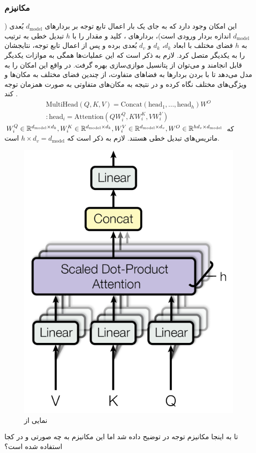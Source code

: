 \subsubsection{مکانیزم \multiheadattention{}}
این امکان وجود دارد که به جای یک بار اعمال تابع توجه بر بردارهای $d_\text{model}$ بُعدی ($d_\text{model}$ اندازه بردار ورودی است)، بردارهای \query{}، کلید و مقدار را با $h$ تبدیل خطی به ترتیب به $h$ فضای مختلف با ابعاد $d_k$، $d_k$ و $d_v$ بُعدی برده و پس از اعمال تابع توجه، نتایجشان را به یکدیگر متصل کرد. لازم به ذکر است که این عملیات‌ها همگی به موازات یکدیگر  قابل انجامند و می‌توان از پتانسیل موازی‌سازی \gpu{} بهره گرفت. در واقع \multiheadattention{} این امکان را به مدل می‌دهد تا با بردن بردارها به فضاهای متفاوت، از چندین فضای مختلف به مکان‌ها و ویژگی‌های مختلف نگاه کرده و در نتیجه به مکان‌های متفاوتی به صورت همزمان توجه کند \cite{transformer}.
\begin{gather}
	\text{MultiHead}(Q, K, V) = \text{Concat}(\text{head}_1, ..., \text{head}_h)W^O \nonumber
	\\
	: \text{head}_i = \text{Attention}(QW_i^Q, KW_i^K, VW_i^V)
\end{gather}
که
$W_i^Q \in {\mathbb{R}}^{d_\text{model} \times d_k},
	W_i^K \in {\mathbb{R}}^{d_\text{model} \times d_k},
	W_i^V \in {\mathbb{R}}^{d_\text{model} \times d_v},
	W^O \in {\mathbb{R}}^{hd_v \times d_\text{model}}$
ماتریس‌های تبدیل خطی هستند. لازم به ذکر است که $h \times d_v = d_\text{model}$ است.
\begin{figure}[H]
	\centering
	\includegraphics[width=.4
		\textwidth]{images/attention2.png}
	\caption{نمایی از \multiheadattention{}}
\end{figure}
تا به اینجا مکانیزم توجه در \transformer{} توضیح داده شد اما این مکانیزم به چه صورتی و در کجا استفاده شده است؟
